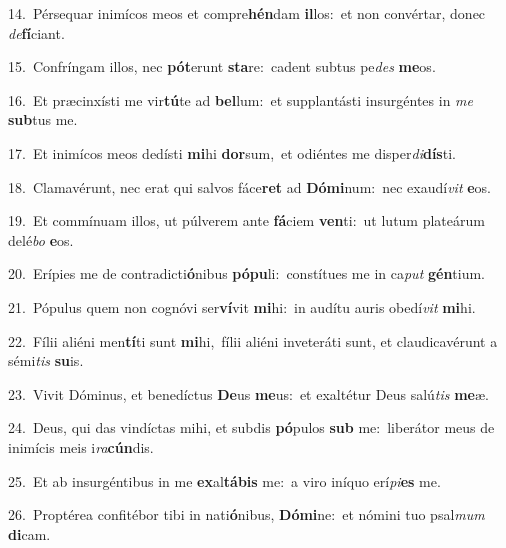 {\numbfont\textcolor{\numbcolor}{14.}}~Pérsequar inimícos meos et compre\-\textbf{hén}\-dam \textbf{il}\-los:~\star et non convértar, donec \textit{de}\-\textbf{fí}ciant.\par
{\numbfont\textcolor{\numbcolor}{15.}}~Confríngam illos, nec \textbf{pót}\-erunt \textbf{sta}\-re:~\star cadent subtus pe\textit{des} \textbf{me}\-os.\par
{\numbfont\textcolor{\numbcolor}{16.}}~Et præcinxísti me vir\-\textbf{tú}\-te ad \textbf{bel}\-lum:~\star et supplantásti insurgéntes in \textit{me} \textbf{sub}\-tus me.\par
{\numbfont\textcolor{\numbcolor}{17.}}~Et inimícos meos dedísti \textbf{mi}\-hi \textbf{dor}\-sum,~\star et odiéntes me disper\-\textit{di}\-\textbf{dís}ti.\par
{\numbfont\textcolor{\numbcolor}{18.}}~Clamavérunt, nec erat qui salvos fáce\textbf{ret} ad \textbf{Dó}\-\textbf{mi}num:~\star nec exaudí\textit{vit} \textbf{e}\-os.\par
{\numbfont\textcolor{\numbcolor}{19.}}~Et commínuam illos, ut púlverem ante \textbf{fá}\-ciem \textbf{ven}\-ti:~\star ut lutum plateárum delé\textit{bo} \textbf{e}\-os.\par
{\numbfont\textcolor{\numbcolor}{20.}}~Erípies me de contradicti\-\textbf{ó}\-nibus \textbf{pó}\-\textbf{pu}li:~\star constítues me in ca\textit{put} \textbf{gén}\-tium.\par
{\numbfont\textcolor{\numbcolor}{21.}}~Pópulus quem non cognóvi ser\-\textbf{ví}\-vit \textbf{mi}\-hi:~\star in audítu auris obedí\textit{vit} \textbf{mi}\-hi.\par
{\numbfont\textcolor{\numbcolor}{22.}}~Fílii aliéni men\-\textbf{tí}\-ti sunt \textbf{mi}\-hi,~\star fílii aliéni inveteráti sunt, et claudicavérunt a sémi\textit{tis} \textbf{su}\-is.\par
{\numbfont\textcolor{\numbcolor}{23.}}~Vivit Dóminus, et benedíctus \textbf{De}\-us \textbf{me}\-us:~\star et exaltétur Deus salú\textit{tis} \textbf{me}\-æ.\par
{\numbfont\textcolor{\numbcolor}{24.}}~Deus, qui das vindíctas mihi, et subdis \textbf{pó}\-pulos \textbf{sub} me:~\star liberátor meus de inimícis meis i\-\textit{ra}\-\textbf{cún}dis.\par
{\numbfont\textcolor{\numbcolor}{25.}}~Et ab insurgéntibus in me \textbf{ex}\-al\-\textbf{tá}\-\textbf{bis} me:~\star a viro iníquo erí\-\textit{pi}\-\textbf{es} me.\par
{\numbfont\textcolor{\numbcolor}{26.}}~Proptérea confitébor tibi in nati\-\textbf{ó}\-nibus, \textbf{Dó}\-\textbf{mi}ne:~\star et nómini tuo psal\textit{mum} \textbf{di}\-cam.\par
